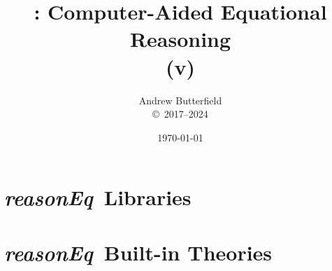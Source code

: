 \documentclass[fleqn,10pt]{report}
\author{
Andrew Butterfield
\\
{\small \copyright\ 2017--2024}
}
\title{
  \reasonEq: Computer-Aided Equational Reasoning
  \\(v\reqVersion)
}
\date{
\today
}
\def\reasonEq{\textit{\textsf{reasonEq}}}
\begin{document}
\maketitle
\setcounter{tocdepth}{1}
\tableofcontents

% 

\part{\reasonEq\ Libraries}


\newpage
\newpage
\newpage

% 



\part{\reasonEq\ Built-in Theories}
\end{document}
